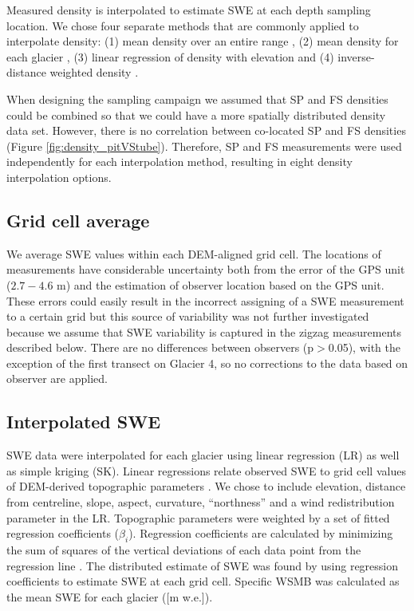\documentclass[review,oneside, letterpaper]{igs}
\begin{document}
Measured density is interpolated to estimate SWE at each depth sampling location. We chose four separate methods that are commonly applied to interpolate density: (1) mean density over an entire range \citep[e.g.][]{Cullen2017}, (2) mean density for each glacier \citep[e.g.][]{Elder1991, McGrath2015}, (3) linear regression of density with elevation \citep[e.g.][]{Elder1998, Molotch2005} and (4) inverse-distance weighted density \citep[e.g.][]{Molotch2005}. 

When designing the sampling campaign we assumed that SP and FS densities could be combined so that we could have a more spatially distributed density data set. However, there is no correlation between co-located SP and FS densities (Figure \ref{fig:density_pitVStube}). Therefore, SP and FS measurements were used independently for each interpolation method, resulting in eight density interpolation options. 

\subsection{Grid cell average}

We average SWE values within each DEM-aligned grid cell. The locations of measurements have considerable uncertainty both from the error of the GPS unit ($2.7 - 4.6$ m) and the estimation of observer location based on the GPS unit. These errors could easily result in the incorrect assigning of a SWE measurement to a certain grid but this source of variability was not further investigated because we assume that SWE variability is captured in the zigzag measurements described below. There are no differences between observers (p$>$0.05), with the exception of the first transect on Glacier 4, so no corrections to the data based on observer are applied.

\subsection{Interpolated SWE}

SWE data were interpolated for each glacier using linear regression (LR) as well as simple kriging (SK). Linear regressions relate observed SWE to grid cell values of DEM-derived topographic parameters \citep{Davis1986}. We chose to include elevation, distance from centreline, slope, aspect, curvature, ``northness'' and a wind redistribution parameter in the LR. Topographic parameters were weighted by a set of fitted regression coefficients ($\beta_i$). Regression coefficients are calculated by minimizing the sum of squares of the vertical deviations of each data point from the regression line \citep{Davis1986}. The distributed estimate of SWE was found by using regression coefficients to estimate SWE at each grid cell. Specific WSMB was calculated as the mean SWE for each glacier ([m w.e.]). 
\end{document}
